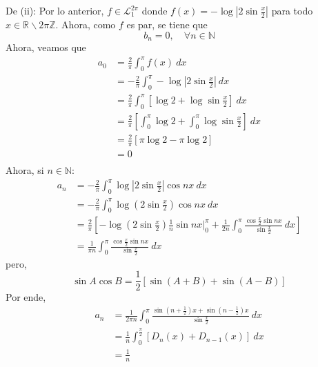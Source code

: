 \documentclass[12pt]{report}
\newcounter{it}
\theoremstyle{largebreak}
\newcommand\abs[1]{\ensuremath{\left|#1\right|}}
\begin{document}
\begin{sol}
        De (ii): Por lo anterior, $f\in\mathcal{L}_1^{2\pi}$ donde $f(x)=-\log\abs{2\sin\frac{x}{2}}$ para todo $x\in\mathbb{R}\backslash2\pi\mathbb{Z}$. Ahora, como $f$ es par, se tiene que
        \begin{equation*}
            b_n=0,\quad\forall n\in\mathbb{N}
        \end{equation*}
        Ahora, veamos que
        \begin{equation*}
            \begin{split}
                a_0&=\frac{2}{\pi}\int_0^\pi f(x)\:dx\\
                &=-\frac{2}{\pi}\int_0^\pi -\log\abs{2\sin\frac{x}{2}}\:dx\\
                &=\frac{2}{\pi}\int_0^\pi \left[\log2+\log\sin\frac{x}{2}\right]\:dx\\
                &=\frac{2}{\pi}\left[\int_0^\pi\log2+\int_0^\pi\log\sin\frac{x}{2}\right]\:dx\\
                &=\frac{2}{\pi}\left[\pi\log2-\pi\log2\right]\\
                &=0\\
            \end{split}
        \end{equation*}
        Ahora, si $n\in\mathbb{N}$:
        \begin{equation*}
            \begin{split}
                a_n&=-\frac{2}{\pi}\int_0^{\pi}\log\abs{2\sin\frac{x}{2}}\cos nx\:dx\\
                &=-\frac{2}{\pi}\int_0^{\pi}\log\left(2\sin\frac{x}{2}\right)\cos nx\:dx\\
                &=\frac{2}{\pi}\left[-\log\left(2\sin\frac{x}{2}\right)\frac{1}{n}\sin nx\Big|_0^{\pi}+\frac{1}{2n}\int_0^{\pi}\frac{\cos\frac{x}{2}\sin nx}{\sin\frac{x}{2}}\:dx \right]\\
                &=\frac{1}{\pi n}\int_0^{\pi}\frac{\cos\frac{x}{2}\sin nx}{\sin\frac{x}{2}}\:dx
            \end{split}
        \end{equation*}
        pero,
        \begin{equation*}
            \sin A\cos B=\frac{1}{2}\left[\sin(A+B)+\sin(A-B) \right]
        \end{equation*}
        Por ende,
        \begin{equation*}
            \begin{split}
                a_n&=\frac{1}{2\pi n}\int_0^{\pi}\frac{\sin\left(n+\frac{1}{2}\right)x+\sin\left(n-\frac{1}{2}\right)x}{\sin\frac{x}{2}}\:dx\\
                &=\frac{1}{n}\int_0^{\frac{\pi}{2}}\left[D_n(x)+D_{ n-1}(x)\right]\:dx\\
                &=\frac{1}{n}\\
            \end{split}
        \end{equation*}


\end{sol}
\end{document}
